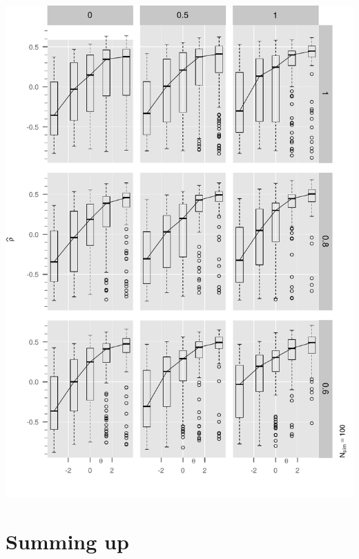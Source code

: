 \documentclass[10pt]{beamer}
\begin{document}
\begin{frame}[fragile]

\begin{center}
  \includegraphics[width=1.00\textwidth]{Figure2/boxplotArray2.pdf}
\end{center}

\end{frame}


\section*{Summing up}
\end{document}
